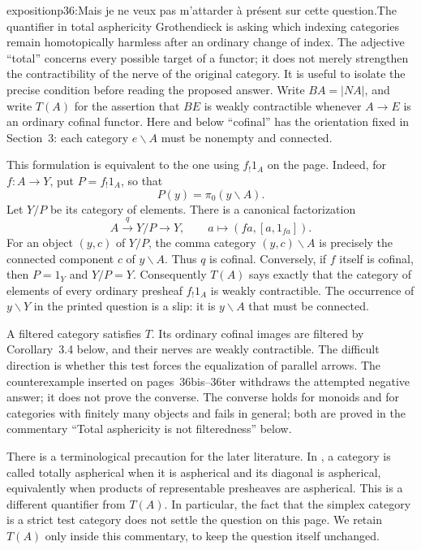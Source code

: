 \begin{dcomment}{exposition}{p36:Mais je ne veux pas m'attarder à présent sur cette question.}{The quantifier in total asphericity}
Grothendieck is asking which indexing categories remain homotopically harmless after an ordinary change of index. The adjective ``total'' concerns every possible target of a functor; it does not merely strengthen the contractibility of the nerve of the original category. It is useful to isolate the precise condition before reading the proposed answer. Write $B A=|N A|$, and write $T(A)$ for the assertion that $B E$ is weakly contractible whenever $A\longrightarrow E$ is an ordinary cofinal functor. Here and below ``cofinal'' has the orientation fixed in Section~3: each category $e\backslash A$ must be nonempty and connected.

This formulation is equivalent to the one using $f_!1_A$ on the page. Indeed, for $f:A\longrightarrow Y$, put $P=f_!1_A$, so that
\[
 P(y)=\pi_0(y\backslash A).
\]
Let $Y/P$ be its category of elements. There is a canonical factorization
\[
 A\xrightarrow{q}Y/P\longrightarrow Y,
 \qquad a\longmapsto(fa,[a,1_{fa}]).
\]
For an object $(y,c)$ of $Y/P$, the comma category $(y,c)\backslash A$ is precisely the connected component $c$ of $y\backslash A$. Thus $q$ is cofinal. Conversely, if $f$ itself is cofinal, then $P=1_Y$ and $Y/P=Y$. Consequently $T(A)$ says exactly that the category of elements of every ordinary presheaf $f_!1_A$ is weakly contractible. The occurrence of $y\backslash Y$ in the printed question is a slip: it is $y\backslash A$ that must be connected.

A filtered category satisfies $T$. Its ordinary cofinal images are filtered by Corollary~3.4 below, and their nerves are weakly contractible. The difficult direction is whether this test forces the equalization of parallel arrows. The counterexample inserted on pages~36bis--36ter withdraws the attempted negative answer; it does not prove the converse. The converse holds for monoids and for categories with finitely many objects and fails in general; both are proved in the commentary ``Total asphericity is not filteredness'' below.

There is a terminological precaution for the later literature. In \citet[Definition~1.7.2 and Proposition~1.7.1]{Maltsiniotis2020}, a category is called totally aspherical when it is aspherical and its diagonal is aspherical, equivalently when products of representable presheaves are aspherical. This is a different quantifier from $T(A)$. In particular, the fact that the simplex category is a strict test category does not settle the question on this page. We retain $T(A)$ only inside this commentary, to keep the question itself unchanged.
\end{dcomment}


